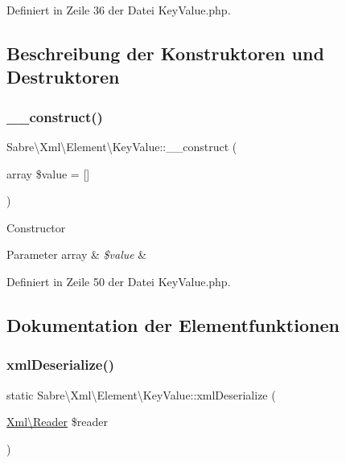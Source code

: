 Definiert in Zeile 36 der Datei Key\+Value.\+php.



\subsection{Beschreibung der Konstruktoren und Destruktoren}
\mbox{\label{class_sabre_1_1_xml_1_1_element_1_1_key_value_af4bb1d6d1ddaad7ecd984b6189e2ec3a}} 
\subsubsection{\texorpdfstring{\+\_\+\+\_\+construct()}{\_\_construct()}}
{\footnotesize\ttfamily Sabre\textbackslash{}\+Xml\textbackslash{}\+Element\textbackslash{}\+Key\+Value\+::\+\_\+\+\_\+construct (\begin{DoxyParamCaption}\item[{array}]{\$value = {\ttfamily \mbox{[}\mbox{]}} }\end{DoxyParamCaption})}

Constructor


\begin{DoxyParams}[1]{Parameter}
array & {\em \$value} & \\
\hline
\end{DoxyParams}


Definiert in Zeile 50 der Datei Key\+Value.\+php.



\subsection{Dokumentation der Elementfunktionen}
\mbox{\label{class_sabre_1_1_xml_1_1_element_1_1_key_value_a483e9bfde32985dd2d82c45d6760ae31}} 
\subsubsection{\texorpdfstring{xml\+Deserialize()}{xmlDeserialize()}}
{\footnotesize\ttfamily static Sabre\textbackslash{}\+Xml\textbackslash{}\+Element\textbackslash{}\+Key\+Value\+::xml\+Deserialize (\begin{DoxyParamCaption}\item[{\mbox{\hyperlink{class_sabre_1_1_xml_1_1_reader}{Xml\textbackslash{}\+Reader}}}]{\$reader }\end{DoxyParamCaption})\hspace{0.3cm}{\ttfamily [static]}}

